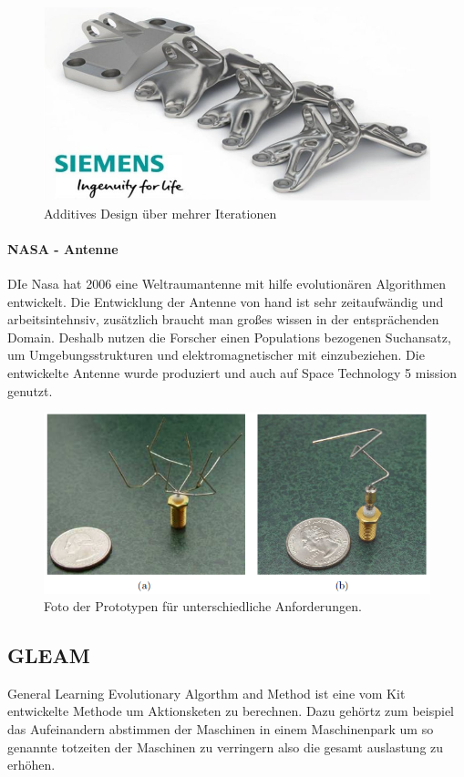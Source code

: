 \noindent%
\begin{figure}[H]
  \centering  
  \includegraphics[scale=0.3]{img/Additive.png}
  \caption{Additives Design über mehrer Iterationen}
  \label{fig:Ablauf_kurz}
\end{figure}

\paragraph{NASA - Antenne}
DIe Nasa hat 2006 eine Weltraumantenne mit hilfe evolutionären Algorithmen entwickelt. Die Entwicklung der Antenne von hand ist sehr zeitaufwändig und arbeitsintehnsiv, zusätzlich braucht man großes wissen in der entsprächenden Domain. Deshalb nutzen die Forscher einen Populations bezogenen Suchansatz, um Umgebungsstrukturen und  elektromagnetischer mit einzubeziehen. Die entwickelte Antenne wurde produziert und auch auf Space Technology 5 mission genutzt.
\cite{AutomatedAntenna}
\noindent%
\begin{figure}[H]
  \centering  
  \includegraphics[scale=0.5]{img/nasa-antenne.png}
  \caption{Foto der Prototypen für unterschiedliche Anforderungen. \cite{AutomatedAntenna}}
  \label{fig:Ablauf_kurz}
\end{figure}


\subsection{GLEAM}
General Learning Evolutionary Algorthm and Method ist eine vom Kit entwickelte Methode um Aktionsketen zu berechnen. Dazu gehörtz zum beispiel das Aufeinandern abstimmen der Maschinen in einem Maschinenpark um so genannte totzeiten der Maschinen zu verringern also die gesamt auslastung zu erhöhen.

